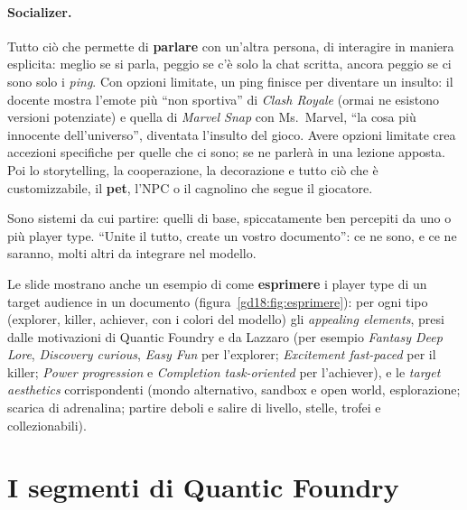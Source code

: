 \paragraph{Socializer.} Tutto ciò che permette di \textbf{parlare} con un'altra
persona, di interagire in maniera esplicita: meglio se si parla, peggio se c'è solo la
chat scritta, ancora peggio se ci sono solo i \emph{ping}. Con opzioni limitate, un
ping finisce per diventare un insulto: il docente mostra l'emote più ``non
sportiva'' di \emph{Clash Royale} (ormai ne esistono versioni potenziate) e quella di
\emph{Marvel Snap} con Ms.\ Marvel, ``la cosa più innocente dell'universo'',
diventata l'insulto del gioco. Avere opzioni limitate crea accezioni specifiche per
quelle che ci sono; se ne parlerà in una lezione apposta. Poi lo storytelling, la
cooperazione, la decorazione e tutto ciò che è customizzabile, il \textbf{pet}, l'NPC
o il cagnolino che segue il giocatore.

Sono sistemi da cui partire: quelli di base, spiccatamente ben percepiti da uno o più
player type. ``Unite il tutto, create un vostro documento'': ce ne sono, e ce ne
saranno, molti altri da integrare nel modello.


Le slide mostrano anche un esempio di come \textbf{esprimere} i player type di un
target audience in un documento (figura~\ref{gd18:fig:esprimere}): per ogni tipo
(explorer, killer, achiever, con i colori del modello) gli \emph{appealing elements},
presi dalle motivazioni di Quantic Foundry e da Lazzaro (per esempio \emph{Fantasy
Deep Lore}, \emph{Discovery curious}, \emph{Easy Fun} per l'explorer;
\emph{Excitement fast-paced} per il killer; \emph{Power progression} e
\emph{Completion task-oriented} per l'achiever), e le \emph{target aesthetics}
corrispondenti (mondo alternativo, sandbox e open world, esplorazione; scarica di
adrenalina; partire deboli e salire di livello, stelle, trofei e collezionabili).

\section{I segmenti di Quantic Foundry}
\label{gd18:sec:segmenti}



